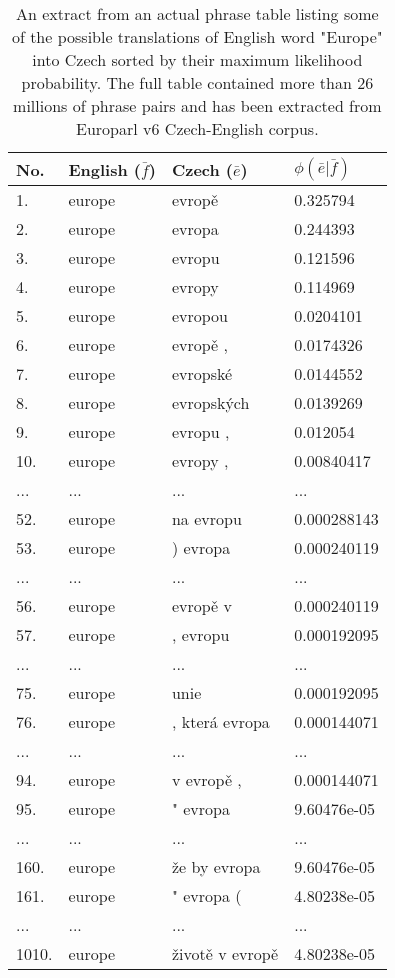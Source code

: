 \begin{table}[ht]
\centering
\begin{tabular}{ l l l l }
No. & English ($\bar{f}$) & Czech ($\bar{e}$) & $\phi(\bar{e}|\bar{f})$ \\
\hline
\hline
1. & europe & evropě & 0.325794 \\
2. & europe & evropa & 0.244393 \\
3. & europe & evropu & 0.121596 \\
4. & europe & evropy & 0.114969 \\
5. & europe & evropou & 0.0204101 \\
6. & europe & evropě , & 0.0174326 \\
7. & europe & evropské & 0.0144552 \\
8. & europe & evropských & 0.0139269 \\
9. & europe & evropu , & 0.012054 \\
10. & europe & evropy , & 0.00840417 \\
... & ... & ... & ... \\
52. & europe & na evropu & 0.000288143 \\
53. & europe & ) evropa & 0.000240119 \\
... & ... & ... & ... \\
56. & europe & evropě v & 0.000240119 \\
57. & europe & , evropu & 0.000192095 \\
... & ... & ... & ... \\
75. & europe & unie & 0.000192095 \\
76. & europe & , která evropa & 0.000144071 \\
... & ... & ... & ... \\
94. & europe & v evropě , & 0.000144071 \\
95. & europe & " evropa & 9.60476e-05 \\
... & ... & ... & ... \\
160. & europe & že by evropa & 9.60476e-05 \\
161. & europe & " evropa ( & 4.80238e-05 \\
... & ... & ... & ... \\
1010. & europe & životě v evropě & 4.80238e-05 \\
\hline
\hline
\end{tabular}
\caption{\label{phrase-table-europarl}
An extract from an actual phrase table listing some of the possible translations of English
word "Europe" into Czech sorted by their maximum likelihood probability.
The full table contained more than 26 millions of phrase pairs and has been extracted
from Europarl v6 Czech-English corpus.}
\end{table}

